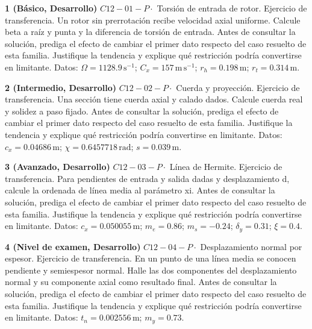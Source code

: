 \documentclass[10pt,openany]{book}
\begin{document}
\begin{tcolorbox}[title={Ejercicios propuestos}, studiumworked, breakable]

\noindent\textbf{1 (Básico, Desarrollo)}
\(C12-01-P \cdot\) Torsión de entrada de rotor. Ejercicio de transferencia. Un rotor sin prerrotación recibe velocidad axial uniforme. Calcule beta a raíz y punta y la diferencia de torsión de entrada. Antes de consultar la solución, prediga el efecto de cambiar el primer dato respecto del caso resuelto de esta familia. Justifique la tendencia y explique qué restricción podría convertirse en limitante. Datos: \(\Omega=1128.9\, \mathrm{s}^{-1}\); \(C_x=157\, \mathrm{m}\,\mathrm{s}^{-1}\); \(r_h=0.198\, \mathrm{m}\); \(r_t=0.314\, \mathrm{m}\).

\noindent\textbf{2 (Intermedio, Desarrollo)}
\(C12-02-P \cdot\) Cuerda y proyección. Ejercicio de transferencia. Una sección tiene cuerda axial y calado dados. Calcule cuerda real y solidez a paso fijado. Antes de consultar la solución, prediga el efecto de cambiar el primer dato respecto del caso resuelto de esta familia. Justifique la tendencia y explique qué restricción podría convertirse en limitante. Datos: \(c_x=0.04686\, \mathrm{m}\); \(\chi=0.6457718\, \mathrm{rad}\); \(s=0.039\, \mathrm{m}\).

\noindent\textbf{3 (Avanzado, Desarrollo)}
\(C12-03-P \cdot\) Línea de Hermite. Ejercicio de transferencia. Para pendientes de entrada y salida dadas y desplazamiento d, calcule la ordenada de línea media al parámetro xi. Antes de consultar la solución, prediga el efecto de cambiar el primer dato respecto del caso resuelto de esta familia. Justifique la tendencia y explique qué restricción podría convertirse en limitante. Datos: \(c_x=0.050055\, \mathrm{m}\); \(m_e=0.86\); \(m_s=-0.24\); \(\delta_y=0.31\); \(\xi=0.4\).

\noindent\textbf{4 (Nivel de examen, Desarrollo)}
\(C12-04-P \cdot\) Desplazamiento normal por espesor. Ejercicio de transferencia. En un punto de una línea media se conocen pendiente y semiespesor normal. Halle las dos componentes del desplazamiento normal y su componente axial como resultado final. Antes de consultar la solución, prediga el efecto de cambiar el primer dato respecto del caso resuelto de esta familia. Justifique la tendencia y explique qué restricción podría convertirse en limitante. Datos: \(t_n=0.002556\, \mathrm{m}\); \(m_y=0.73\).
\end{tcolorbox}


\studiumchaptercheck
\end{document}
